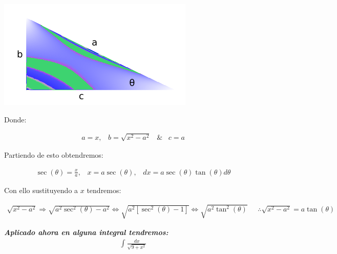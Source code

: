 \begin{center}
  \includegraphics[scale=0.5]{imgsAux/triangulo2.png}\\
\end{center}

Donde:

\begin{equation*}
    \begin{gathered}
        a=x,\;\;\; b=\sqrt{x^{2}-a^{2}} \;\;\;\&\;\;\; c=a
    \end{gathered}
\end{equation*}

Partiendo de esto obtendremos:

\begin{equation*}
    \begin{gathered}
        \sec(\theta)= \frac{x}{a},\;\;\; x=a\sec(\theta),\;\;\; dx=a\sec(\theta)\tan(\theta)d\theta
    \end{gathered}
\end{equation*}

Con ello sustituyendo a \(\displaystyle x\) tendremos:

\begin{equation*}
    \begin{gathered}
        \sqrt{x^{2}-a^{2}}\Rightarrow \sqrt{a^{2}\sec^{2}(\theta)-a^{2}} \Leftrightarrow \sqrt{a^{2}[\sec^{2}(\theta)-1]} \Leftrightarrow \sqrt{a^{2}\tan^{2}(\theta)}\;\;\;\;\; \therefore \sqrt{x^{2}-a^{2}}=a\tan(\theta)
    \end{gathered}
\end{equation*}

\textit{\textbf{Aplicado ahora en alguna integral tendremos:}}
\begin{equation}
    \begin{gathered}
        \int \frac{dx}{\sqrt{9+x^{2}}}
    \end{gathered}
\end{equation}


